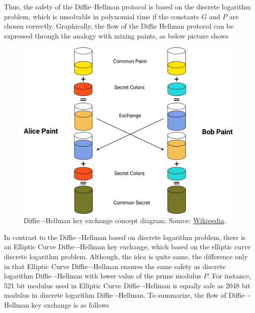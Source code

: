 Thus, the safety of the Diffie--Hellman protocol is based on the discrete logarithm problem, which is unsolvable
in polynomial time if the constants $G$ and $P$ are chosen correctly.
Graphically, the flow of the Diffie Hellman protocol can be expressed through the
analogy with mixing paints, as below picture shows
\begin{figure}[H]
    \centering
    \includegraphics[width=1\textwidth]{Pictures/07_Diffie-Hellman_keyexchange_concept_diagram}
    \caption{Diffie–-Hellman key exchange concept diagram.
    Source: \href{https://en.wikipedia.org/wiki/Diffie-Hellman_key_exchange}{Wikipedia}.}\label{fig:figure4}
\end{figure}
In contrast to the Diffie–-Hellman based on discrete logarithm problem, there is an Elliptic Curve Diffie–-Hellman
key exchange, which based on the elliptic curve discrete logarithm problem.
Although, the idea is quite same, the difference only in that Elliptic Curve Diffie–-Hellman ensures the same safety
as discrete logarithm Diffie–-Hellman with lower value of the prime modulus $P$.
For instance, 521 bit modulus used in Elliptic Curve Diffie–-Hellman is equally safe as 2048 bit modulus in
discrete logarithm Diffie–-Hellman.
To summarize, the flow of Diffie–-Hellman key exchange is as follows
